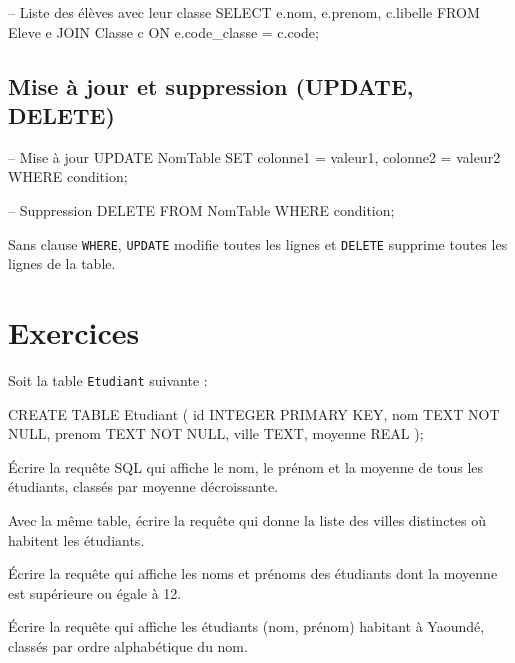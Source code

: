 \begin{exemple}
\begin{sqlcode}
-- Liste des élèves avec leur classe
SELECT e.nom, e.prenom, c.libelle
FROM Eleve e
JOIN Classe c ON e.code_classe = c.code;
\end{sqlcode}
\end{exemple}

\subsection{Mise à jour et suppression (UPDATE, DELETE)}
\begin{definition}[Syntaxes]
\begin{sqlcode}
-- Mise à jour
UPDATE NomTable
SET colonne1 = valeur1, colonne2 = valeur2
WHERE condition;

-- Suppression
DELETE FROM NomTable
WHERE condition;
\end{sqlcode}
\end{definition}

\begin{aretenir}
Sans clause \texttt{WHERE}, \texttt{UPDATE} modifie toutes les lignes et \texttt{DELETE} supprime toutes les lignes de la table.
\end{aretenir}

\section{Exercices}


\exo{}
Soit la table \texttt{Etudiant} suivante :
\begin{sqlcode}
CREATE TABLE Etudiant (
    id INTEGER PRIMARY KEY,
    nom TEXT NOT NULL,
    prenom TEXT NOT NULL,
    ville TEXT,
    moyenne REAL
);
\end{sqlcode}
Écrire la requête SQL qui affiche le nom, le prénom et la moyenne de tous les étudiants, classés par moyenne décroissante.

\exo{}
Avec la même table, écrire la requête qui donne la liste des villes distinctes où habitent les étudiants.

\exo{}
Écrire la requête qui affiche les noms et prénoms des étudiants dont la moyenne est supérieure ou égale à 12.

\exo{}
Écrire la requête qui affiche les étudiants (nom, prénom) habitant à Yaoundé, classés par ordre alphabétique du nom.

